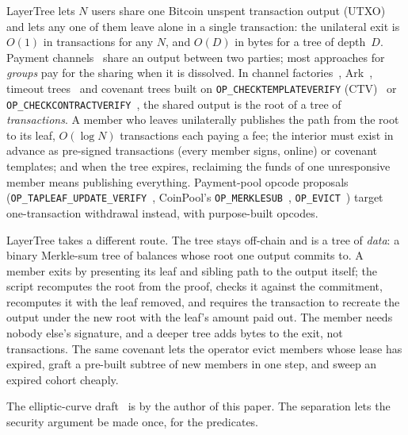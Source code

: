 \documentclass[runningheads]{llncs}
\newif\ifanon
\newif\iffullversion
\newcommand{\op}[1]{\texttt{OP\_#1}}
\begin{document}
LayerTree lets $N$ users share one Bitcoin unspent transaction output
(UTXO) and lets any one of them leave alone in a single transaction: the
unilateral exit is $O(1)$ in transactions for any $N$, and $O(D)$ in
bytes for a tree of depth~$D$. Payment channels~\cite{lightning} share
an output between two parties; most approaches for \emph{groups} pay for
the sharing when it is dissolved. In channel factories~\cite{factories},
Ark~\cite{ark,clark}, timeout trees~\cite{timeouttrees,superscalar} and
covenant trees built on \op{CHECKTEMPLATEVERIFY} (CTV)~\cite{bip119} or
\op{CHECKCONTRACTVERIFY}~\cite{bip443,matt}, the shared output is the root
of a tree of \emph{transactions}. A member who leaves unilaterally
publishes the path from the root to its leaf, $O(\log N)$ transactions
each paying a fee; the interior must exist in advance as pre-signed
transactions (every member signs, online) or covenant templates; and
when the tree expires, reclaiming the funds of one unresponsive member
means publishing everything. Payment-pool opcode proposals
(\texttt{OP\_TAPLEAF\_\allowbreak UPDATE\_\allowbreak VERIFY}~\cite{tluv}, CoinPool's
\op{MERKLESUB}~\cite{coinpool}, \op{EVICT}~\cite{opevict}) target
one-transaction withdrawal instead, with purpose-built opcodes.

LayerTree takes a different route. The tree stays off-chain and is a
tree of \emph{data}: a binary Merkle-sum tree of balances whose root one
output commits to. A member exits by presenting its leaf and sibling path
to the output itself; the script recomputes the root from the proof,
checks it against the commitment, recomputes it with the leaf removed,
and requires the transaction to recreate the output under the new root
with the leaf's amount paid out. The member needs nobody else's signature,
and a deeper tree adds bytes to the exit, not transactions. The same covenant lets the operator evict members whose lease has expired,
graft a pre-built subtree of new members in one step, and sweep an
expired cohort cheaply.

\iffullversion
We present the design from the interface inwards: an ideal functionality
in the universal composability (UC) framework~\cite{canettiUC}
(\S\ref{sec:func}); an abstract protocol of covenant \emph{predicates}
and honest-party behaviour, independent of opcodes (\S\ref{sec:protocol});
and four realisations by opcode tier (\S\ref{sec:scripts}), from restored
string opcodes (BIPs~440 and 441~\cite{bip440,bip441}), introspection
(\op{TX}~\cite{optx}), stack signature checks
(\op{CHECKSIGFROMSTACK}~\cite{bip348}) and elliptic-curve
arithmetic~\cite{ecops,bip449} down to \op{CAT} and one point-tweak
opcode, plus one built on \op{CHECKCONTRACTVERIFY}~\cite{bip443}. We
propose no opcode for this design, but the tiers are not deployable as
proposals stand: FULL, MID and both CCV variants assume opcodes in a
tapleaf version their proposals do not define, and two drafts claim the same
opcode numbers (\S\ref{sec:scripts}).\ifanon\else{} The elliptic-curve
draft~\cite{ecops} is by the author of this paper.\fi{} The separation
lets the security argument be made once, for the predicates.
\end{document}
